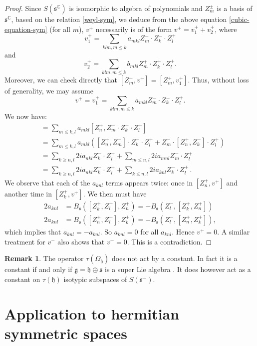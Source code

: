 \documentclass{amsart}[draft,11pt]
\newcommand{\mg}{\mathfrak{g}}
\newcommand{\mh}{\mathfrak{h}}
\newcommand{\ms}{\mathfrak{s}}
\numberwithin{equation}{section}
\theoremstyle{definition}
\newtheorem{remark}[theorem]{Remark}
\begin{document}
\begin{proof}
Since $S(\ms^\mathbb{C})$  is isomorphic to algebra of polynomials and $Z_m^\pm$ is a basis of 
$\ms^\mathbb{C}$,  based on the relation \eqref{weyl-sym}, 
we deduce from the above equation \eqref{cubic-equation-sym} (for all $m$), $v^+$  necessarily is of  the form $v^+=v_1^+ +v_2^+$, 
where  
$$v_1^+ = \sum_{klm,m\leq k}a_{mkl} Z_m^-\cdot Z_k^-\cdot Z_l^+$$  and 
$$v_2^+ = \sum_{klm,m\leq k}b_{mkl} Z_m^+ \cdot Z_k^+\cdot Z_l^+.$$
Moreover, we can check directly that $[Z_m^+,v^+] =[Z_m^+, v_1^+]$. Thus, without loss of generality, we may assume 
$$v^+=v_1^+ = \sum_{klm,m\leq k}a_{mkl} Z_m^-\cdot Z_k^-\cdot Z_l^+.$$
We now have:
\begin{align*}
    [Z_n^+,v^+]
    &= \sum_{m\leq k,l}a_{mkl} [Z_n^+,Z_m^-\cdot Z_k^-\cdot Z_l^+] \\
    &= \sum_{m\leq k,l}a_{mkl} \left(
        [Z_n^+,Z_m^-]\cdot Z_k^-\cdot Z_l^+
        +Z_m^-\cdot [Z_n^+,Z_k^-]\cdot Z_l^+ \right)\\
    &= \sum_{k\geq n,l} 2ia_{nkl}Z_k^-\cdot Z_l^+ 
        + \sum_{m\leq n, l} 2ia_{mnl} Z_m^-\cdot Z_l^+ \\
    &= \sum_{k\geq n,l} 2ia_{nkl}Z_k^-\cdot Z_l^+      +\sum_{k\leq n,l} 2ia_{knl}Z_k^-\cdot Z_l^+\,.
\end{align*}
We observe that each of the $a_{knl}$ terms appears twice: 
once in $[Z_n^+,v^+]$ and another time 
in $[Z_k^+,v^+]$. We then must have
\begin{align*}
     2a_{knl} &= B_\ms([Z_k^+,Z_l^-],Z_n^+)
    =-B_\ms(Z_l^-,[Z_k^+,Z_n^+]) \\
    2a_{knl} &=
    B_\ms([Z_n^+,Z_l^-],Z_k^+)
    =-B_\ms(Z_l^-,[Z_n^+,Z_k^+]),
\end{align*}
which implies that $a_{knl}=-a_{knl}$. So $a_{knl}=0$ for all $a_{knl}$. Hence $v^+=0$. A similar treatment for $v^-$ also shows  that $v^-=0$. This is a contradiction.
\end{proof}

\begin{remark}
The operator $\tau(\Omega_{\mh})$
does not act by a constant. In fact it is a constant if and only if
$\mg=\mh\oplus \ms$ is a super Lie algebra \cite{kostant2001}. 
It does however act as a constant on $\tau(\mh)$ isotypic subspaces of $S(\ms^-)$.
\end{remark}


\section{Application to hermitian symmetric spaces}
\label{symmetrichermitian}
\end{document}
